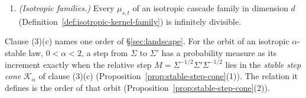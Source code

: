 \begin{theorem}
\begin{enumerate}
$\zeta(s) := \Sigma^{1/2}M^s\Sigma^{1/2}$ and $M := \Sigma^{-1/2}\Sigma'\Sigma^{-1/2}$.
This covers the Loewner order on $\PD(d)$ ($\mathcal K = \{M : M \ge I\}$), the ray order on $\PD(d)$
($\mathcal K = \{cI : c \ge 1\}$), and for $0 < \alpha < 2$ the order of the stable step cone,
$\mathcal K_\alpha := \{M \in \PD(d) : \lambda_{\min}(M)^{d+\alpha} \ge \det M\}$ with $\lambda_{\min}(M)$ the
least eigenvalue; $\mathcal K_\alpha$ is the set of $e^X$ with $X$ symmetric and
$(d+\alpha)\lambda_{\min}(X) \ge \tr X$. These three relations are partial orders.
\item \emph{(Isotropic families.)} Every $\mu_{s,t}$ of an isotropic cascade family in dimension $d$
(Definition~\ref{def:isotropic-kernel-family}) is infinitely divisible.
\end{enumerate}
\end{theorem}

Clause (3)(c) names one order of
\S\ref{sec:landscape}. For the orbit of an isotropic $\alpha$-stable law, $0 < \alpha < 2$, a step
from $\Sigma$ to $\Sigma'$ has a probability measure as its increment exactly when the relative step
$M = \Sigma^{-1/2}\Sigma'\Sigma^{-1/2}$ lies in the \emph{stable step cone} $\mathcal K_\alpha$ of
clause (3)(c) (Proposition~\ref{prop:stable-step-cone}(1)). The relation it defines is the order of
that orbit (Proposition~\ref{prop:stable-step-cone}(2)).

